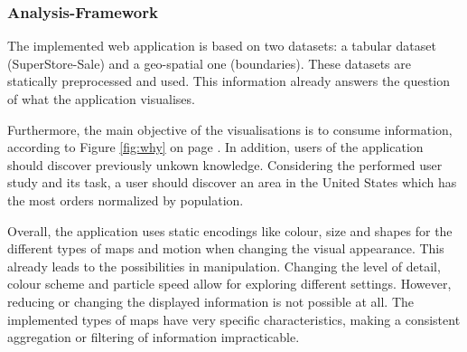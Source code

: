 \subsubsection{Analysis-Framework}
The implemented web application is based on two datasets: a tabular dataset (SuperStore-Sale) and a geo-spatial one (boundaries). These datasets are statically preprocessed and used. This information already answers the question of what the application visualises.

\cbstart
Furthermore, the main objective of the visualisations is to consume information, according to Figure \ref{fig:why} on page \pageref{fig:why}. In addition, users of the application should discover previously unkown knowledge. Considering the performed user study and its task, a user should discover an area in the United States which has the most orders normalized by population.
\cbend

Overall, the application uses static encodings like colour, size and shapes for the different types of maps and motion when changing the visual appearance. This already leads to the possibilities in manipulation. Changing the level of detail, colour scheme and particle speed allow for exploring different settings. However, reducing or changing the displayed information is not possible at all. The implemented types of maps have very specific characteristics, making a consistent aggregation or filtering of information impracticable.
